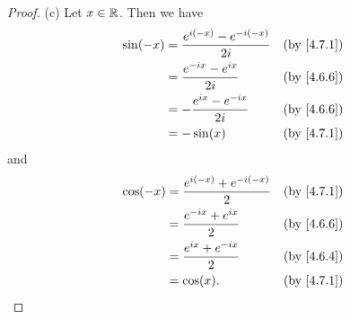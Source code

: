 \begin{proof}{(c)}
  Let \(x \in \mathbb{R}\).
  Then we have
  \begin{align*}
    \sin(-x) & = \dfrac{e^{i (-x)} - e^{- i (-x)}}{2i} &  & \text{(by \cref{4.7.1})} \\
             & = \dfrac{e^{- i x} - e^{i x}}{2i}       &  & \text{(by \cref{4.6.6})} \\
             & = -\dfrac{e^{i x} - e^{- i x}}{2i}      &  & \text{(by \cref{4.6.6})} \\
             & = -\sin(x)                              &  & \text{(by \cref{4.7.1})}
  \end{align*}
  and
  \begin{align*}
    \cos(-x) & = \dfrac{e^{i (-x)} + e^{- i (-x)}}{2} &  & \text{(by \cref{4.7.1})} \\
             & = \dfrac{e^{- i x} + e^{i x}}{2}       &  & \text{(by \cref{4.6.6})} \\
             & = \dfrac{e^{i x} + e^{- i x}}{2}       &  & \text{(by \cref{4.6.4})} \\
             & = \cos(x).                             &  & \text{(by \cref{4.7.1})}
  \end{align*}
\end{proof}

